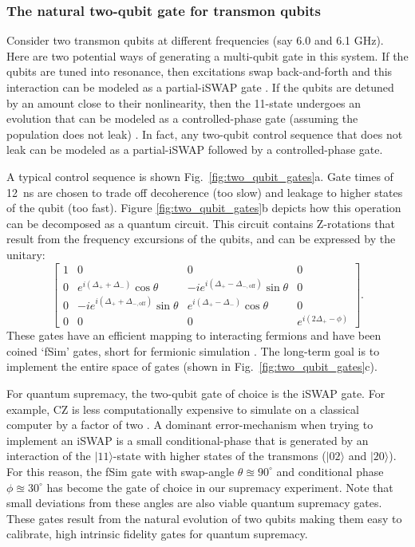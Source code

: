 \subsubsection{The natural two-qubit gate for transmon qubits}
Consider two transmon qubits at different frequencies (say 6.0 and 6.1 GHz).  Here are two potential ways of generating a multi-qubit gate in this system.  If the qubits are tuned into resonance, then excitations swap back-and-forth and this interaction can be modeled as a partial-iSWAP gate \cite{bialczak2010quantum}.  If the qubits are detuned by an amount close to their nonlinearity, then the 11-state undergoes an evolution that can be modeled as a controlled-phase gate (assuming the population does not leak) \cite{martinis2014fast, dicarlo2009cz}.  In fact, any two-qubit control sequence that does not leak can be modeled as a partial-iSWAP followed by a controlled-phase gate.  

A typical control sequence is shown Fig.~\ref{fig:two_qubit_gates}a.  Gate times of 12~ns are chosen to trade off decoherence (too slow) and leakage to higher states of the qubit (too fast).  Figure \ref{fig:two_qubit_gates}b depicts how this operation can be decomposed as a quantum circuit.  This circuit contains Z-rotations that result from the frequency excursions of the qubits, and can be expressed by the unitary:
\begin{equation}\label{eq:unitary_angles}
    \begin{bmatrix}
        1 & 0 & 0 & 0 \\
        0 & e^{i(\Delta_++\Delta_-)}\cos\theta & -ie^{i(\Delta_+-\Delta_{-,\mathrm{off}})}\sin\theta & 0 \\
        0 & -ie^{i(\Delta_++\Delta_{-,\mathrm{off}})}\sin\theta & e^{i(\Delta_+-\Delta_-)}\cos\theta & 0 \\
        0 & 0 & 0 & e^{i(2\Delta_+-\phi)}
    \end{bmatrix}.
\end{equation}
These gates have an efficient mapping to interacting fermions and have been coined `fSim' gates, short for fermionic simulation \cite{kivlichan2018quantum}.  The long-term goal is to implement the entire space of gates (shown in Fig.~\ref{fig:two_qubit_gates}c).

For quantum supremacy, the two-qubit gate of choice is the iSWAP gate. For example, CZ is less computationally expensive to simulate on a classical computer by a factor of two \cite{markov_quantum_2018, villalonga2019flexible}.  A dominant error-mechanism when trying to implement an iSWAP is a small conditional-phase that is generated by an interaction of the $|11\rangle$-state with higher states of the transmons ($|02\rangle$ and $|20\rangle$).  For this reason, the fSim gate with swap-angle $\theta \approxeq 90^{\circ}$ and conditional phase $\phi \approxeq 30^{\circ}$ has become the gate of choice in our supremacy experiment.  Note that small deviations from these angles are also viable quantum supremacy gates.  These gates result from the natural evolution of two qubits making them easy to calibrate, high intrinsic fidelity gates for quantum supremacy.

